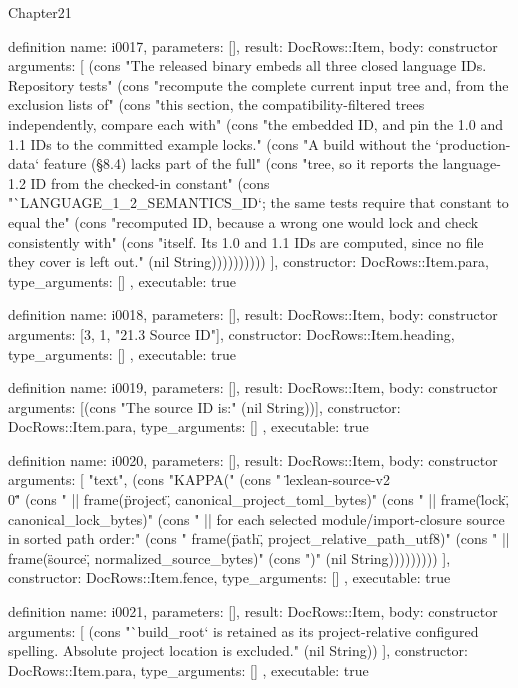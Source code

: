 \begin{lexlean}{Chapter21}
\begin{semanticmodule}
definition{
  name: i0017,
  parameters: [],
  result: DocRows::Item,
  body: constructor{
    arguments: [
      (cons "The released binary embeds all three closed language IDs. Repository tests" (cons "recompute the complete current input tree and, from the exclusion lists of" (cons "this section, the compatibility-filtered trees independently, compare each with" (cons "the embedded ID, and pin the 1.0 and 1.1 IDs to the committed example locks." (cons "A build without the `production-data` feature (§8.4) lacks part of the full" (cons "tree, so it reports the language-1.2 ID from the checked-in constant" (cons "`LANGUAGE_1_2_SEMANTICS_ID`; the same tests require that constant to equal the" (cons "recomputed ID, because a wrong one would lock and check consistently with" (cons "itself. Its 1.0 and 1.1 IDs are computed, since no file they cover is left out." (nil String))))))))))
    ],
    constructor: DocRows::Item.para,
    type_arguments: []
  },
  executable: true
}

definition{
  name: i0018,
  parameters: [],
  result: DocRows::Item,
  body: constructor{
    arguments: [3, 1, "21.3 Source ID"],
    constructor: DocRows::Item.heading,
    type_arguments: []
  },
  executable: true
}

definition{
  name: i0019,
  parameters: [],
  result: DocRows::Item,
  body: constructor{
    arguments: [(cons "The source ID is:" (nil String))],
    constructor: DocRows::Item.para,
    type_arguments: []
  },
  executable: true
}

definition{
  name: i0020,
  parameters: [],
  result: DocRows::Item,
  body: constructor{
    arguments: [
      "text",
      (cons "KAPPA(" (cons "  \"lexlean-source-v2\\0\"" (cons "  || frame(\"project\", canonical_project_toml_bytes)" (cons "  || frame(\"lock\", canonical_lock_bytes)" (cons "  || for each selected module/import-closure source in sorted path order:" (cons "       frame(\"path\", project_relative_path_utf8)" (cons "       || frame(\"source\", normalized_source_bytes)" (cons ")" (nil String)))))))))
    ],
    constructor: DocRows::Item.fence,
    type_arguments: []
  },
  executable: true
}

definition{
  name: i0021,
  parameters: [],
  result: DocRows::Item,
  body: constructor{
    arguments: [
      (cons "`build_root` is retained as its project-relative configured spelling. Absolute project location is excluded." (nil String))
    ],
    constructor: DocRows::Item.para,
    type_arguments: []
  },
  executable: true
}


\end{semanticmodule}
\end{lexlean}
